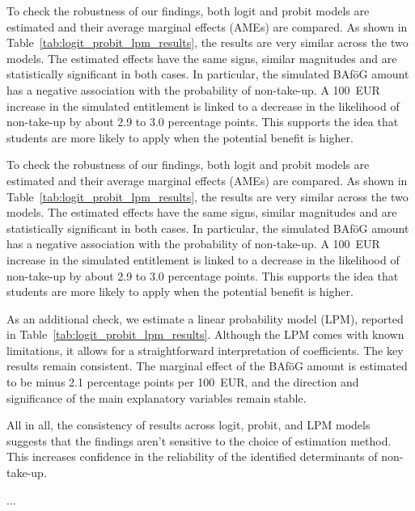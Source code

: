 To check the robustness of our findings, both logit and probit models are estimated and their average marginal effects (AMEs) are compared. 
As shown in Table~\ref{tab:logit_probit_lpm_results}, the results are very similar across the two models. 
The estimated effects have the same signs, similar magnitudes and are statistically significant in both cases. 
In particular, the simulated BAföG amount has a negative association with the probability of non-take-up. 
A 100~EUR increase in the simulated entitlement is linked to a decrease in the likelihood of non-take-up by about 2.9 to 3.0 percentage points. 
This supports the idea that students are more likely to apply when the potential benefit is higher.

To check the robustness of our findings, both logit and probit models are estimated and their average marginal effects (AMEs) are compared. As shown in Table~\ref{tab:logit_probit_lpm_results}, the results are very similar across the two models. The estimated effects have the same signs, similar magnitudes and are statistically significant in both cases. In particular, the simulated BAföG amount has a negative association with the probability of non-take-up. A 100~EUR increase in the simulated entitlement is linked to a decrease in the likelihood of non-take-up by about 2.9 to 3.0 percentage points. This supports the idea that students are more likely to apply when the potential benefit is higher.

As an additional check, we estimate a linear probability model (LPM), reported in Table~\ref{tab:logit_probit_lpm_results}. 
Although the LPM comes with known limitations, it allows for a straightforward interpretation of coefficients. 
The key results remain consistent. The marginal effect of the BAföG amount is estimated to be minus 2.1 percentage points per 100~EUR, and the direction and significance of the main explanatory variables remain stable.

All in all, the consistency of results across logit, probit, and LPM models suggests that the findings aren't sensitive to the choice of estimation method. This increases confidence in the reliability of the identified determinants of non-take-up.

...

